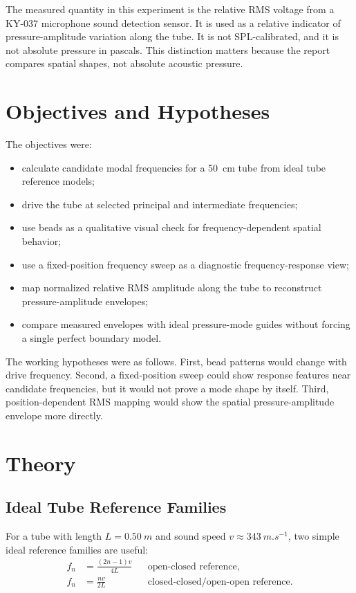 \documentclass[11pt,a4paper]{article}
\begin{document}
The measured quantity in this experiment is the relative RMS voltage from a KY-037 microphone sound detection sensor. It is used as a relative indicator of pressure-amplitude variation along the tube. It is not SPL-calibrated, and it is not absolute pressure in pascals. This distinction matters because the report compares spatial shapes, not absolute acoustic pressure.

\section{Objectives and Hypotheses}

The objectives were:
\begin{itemize}
  \item calculate candidate modal frequencies for a \SI{50}{cm} tube from ideal tube reference models;
  \item drive the tube at selected principal and intermediate frequencies;
  \item use beads as a qualitative visual check for frequency-dependent spatial behavior;
  \item use a fixed-position frequency sweep as a diagnostic frequency-response view;
  \item map normalized relative RMS amplitude along the tube to reconstruct pressure-amplitude envelopes;
  \item compare measured envelopes with ideal pressure-mode guides without forcing a single perfect boundary model.
\end{itemize}

The working hypotheses were as follows. First, bead patterns would change with drive frequency. Second, a fixed-position sweep could show response features near candidate frequencies, but it would not prove a mode shape by itself. Third, position-dependent RMS mapping would show the spatial pressure-amplitude envelope more directly.

\section{Theory}

\subsection{Ideal Tube Reference Families}

For a tube with length \(L=\SI{0.50}{m}\) and sound speed \(v\approx\SI{343}{m.s^{-1}}\), two simple ideal reference families are useful:
\begin{align}
  f_n &= \frac{(2n-1)v}{4L} && \text{open-closed reference},\\
  f_n &= \frac{nv}{2L} && \text{closed-closed/open-open reference}.
\end{align}
\end{document}
